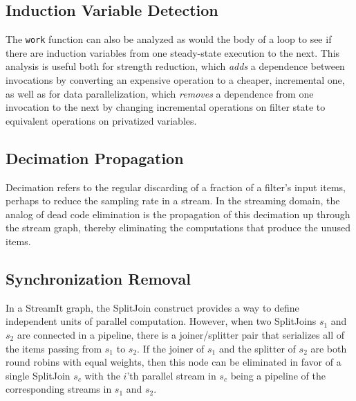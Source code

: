 \subsection{Induction Variable Detection}

The {\tt work} function can also be analyzed as would the body of a loop
to see if there are induction variables from one steady-state execution
to the next.  This analysis is useful both for strength reduction, which
{\it adds} a dependence between invocations by converting an expensive
operation to a cheaper, incremental one, as well as for data
parallelization, which {\it removes} a dependence from one invocation to
the next by changing incremental operations on filter state to
equivalent operations on privatized variables.

\subsection{Decimation Propagation}

Decimation refers to the regular discarding of a fraction of a filter's
input items, perhaps to reduce the sampling rate in a stream.  In the
streaming domain, the analog of dead code elimination is the propagation
of this decimation up through the stream graph, thereby eliminating the
computations that produce the unused items.

\subsection{Synchronization Removal}

In a StreamIt graph, the SplitJoin construct provides a way to define
independent units of parallel computation.  However, when two SplitJoins
$s_1$ and $s_2$ are connected in a pipeline, there is a joiner/splitter
pair that serializes all of the items passing from $s_1$ to $s_2$.  If
the joiner of $s_1$ and the splitter of $s_2$ are both round robins with
equal weights, then this node can be eliminated in favor of a single
SplitJoin $s_c$ with the $i$'th parallel stream in $s_c$ being a
pipeline of the corresponding streams in $s_1$ and $s_2$.

